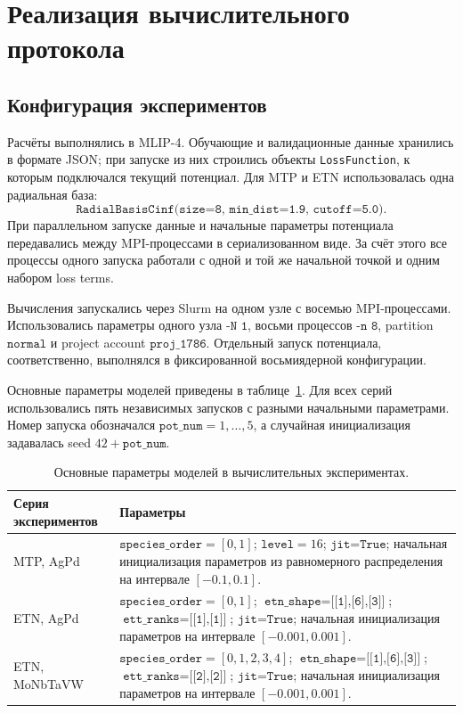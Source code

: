 \section{Реализация вычислительного протокола}
\label{sec:implementation}

\subsection{Конфигурация экспериментов}

Расчёты выполнялись в MLIP-4. Обучающие и валидационные данные хранились в формате JSON; при запуске из них строились объекты \texttt{LossFunction}, к которым подключался текущий потенциал. Для MTP и ETN использовалась одна радиальная база:
\[
    \texttt{RadialBasisCinf(size=8, min\_dist=1.9, cutoff=5.0)}.
\]
При параллельном запуске данные и начальные параметры потенциала передавались между MPI-процессами в сериализованном виде. За счёт этого все процессы одного запуска работали с одной и той же начальной точкой и одним набором loss terms.

Вычисления запускались через Slurm на одном узле с восемью MPI-процессами. Использовались параметры одного узла \(\texttt{-N 1}\), восьми процессов \(\texttt{-n 8}\), partition \(\texttt{normal}\) и project account \(\texttt{proj\_1786}\). Отдельный запуск потенциала, соответственно, выполнялся в фиксированной восьмиядерной конфигурации.

Основные параметры моделей приведены в таблице~\ref{tab:model-config}. Для всех серий использовались пять независимых запусков с разными начальными параметрами. Номер запуска обозначался \(\texttt{pot\_num}=1,\ldots,5\), а случайная инициализация задавалась seed \(42+\texttt{pot\_num}\).

\begin{table}[H]
    \centering
    \caption{Основные параметры моделей в вычислительных экспериментах.}
    \label{tab:model-config}
    \small
    \begin{tabularx}{\textwidth}{p{}X}
        \toprule
        Серия экспериментов & Параметры \\
        \midrule
        MTP, AgPd &
        \(\texttt{species\_order}=[0,1]\);
        \(\texttt{level}=16\);
        \(\texttt{jit=True}\);
        начальная инициализация параметров из равномерного распределения на интервале \([-0.1,0.1]\). \\
        \addlinespace
        ETN, AgPd &
        \(\texttt{species\_order}=[0,1]\);
        \(\texttt{etn\_shape}=\texttt{[[1],[6],[3]]}\);
        \(\texttt{ett\_ranks}=\texttt{[[1],[1]]}\);
        \(\texttt{jit=True}\);
        начальная инициализация параметров на интервале \([-0.001,0.001]\). \\
        \addlinespace
        ETN, MoNbTaVW &
        \(\texttt{species\_order}=[0,1,2,3,4]\);
        \(\texttt{etn\_shape}=\texttt{[[1],[6],[3]]}\);
        \(\texttt{ett\_ranks}=\texttt{[[2],[2]]}\);
        \(\texttt{jit=True}\);
        начальная инициализация параметров на интервале \([-0.001,0.001]\). \\
        \bottomrule
    \end{tabularx}
\end{table}


